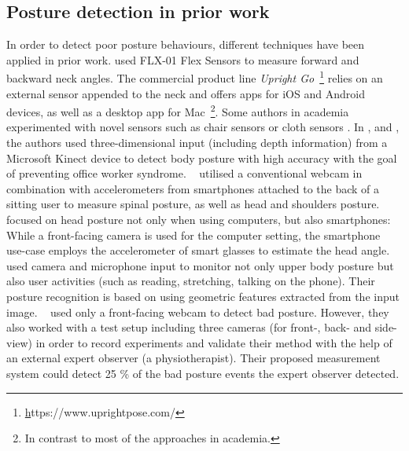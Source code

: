 \subsection{Posture detection in prior work}
In order to detect poor posture behaviours, different techniques have been applied in prior work. \citeauthor{demmans2007posture} \cite{demmans2007posture} used FLX-01 Flex Sensors to measure forward and backward neck angles. The commercial product line \textit{Upright Go}~\footnote{\href{https://www.uprightpose.com/}https://www.uprightpose.com/} relies on an external sensor appended to the neck and offers apps for iOS and Android devices, as well as a desktop app for Mac~\footnote{In contrast to most of the approaches in academia.}. Some authors in academia experimented with novel sensors such as chair sensors or cloth sensors \cite{bibbo2019sitting,cha2017patient,zhang2019architecture}. In \cite{paliyawan2014prolonged},\cite{paliyawan2014office} and \cite{clark2012validity}, the authors used three-dimensional input (including depth information) from a Microsoft Kinect device to detect body posture with high accuracy with the goal of preventing office worker syndrome. \citeauthor{estrada2017sitting}~ \cite{estrada2017sitting} utilised a conventional webcam in combination with accelerometers from smartphones attached to the back of a sitting user to measure spinal posture, as well as head and shoulders posture. \citeauthor{tanaka2015nekoze} ~\cite{tanaka2015nekoze} focused on head posture not only when using computers, but also smartphones: While a front-facing camera is used for the computer setting, the smartphone use-case employs the accelerometer of smart glasses to estimate the head angle. \citeauthor{jaimes2005sit} ~\cite{jaimes2005sit} used camera and microphone input to monitor not only upper body posture but also user activities (such as reading, stretching, talking on the phone). Their posture recognition is based on using geometric features extracted from the input image. \citeauthor{lintila2016development} ~\cite{lintila2016development} used only a front-facing webcam to detect bad posture. However, they also worked with a test setup including three cameras (for front-, back- and side-view) in order to record experiments and validate their method with the help of an external expert observer (a physiotherapist). Their proposed measurement system could detect 25 \% of the bad posture events the expert observer detected.

